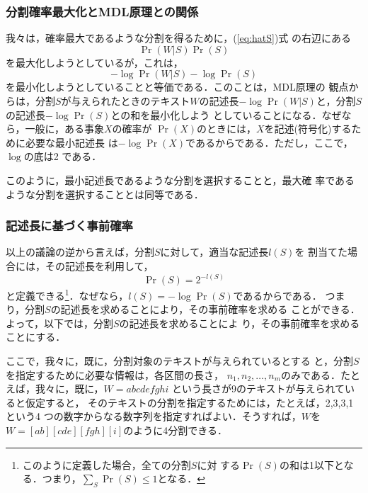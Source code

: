 \subsubsection{分割確率最大化とMDL原理との関係}

我々は，確率最大であるような分割を得るために，(\ref{eq:hatS})式
の右辺にある
\begin{equation}
  \Pr(W|S) \Pr(S)
\end{equation}
を最大化しようとしているが，これは，
\begin{equation}
  - \log \Pr(W|S) - \log \Pr(S)
\end{equation}
を最小化しようとしていることと等価である．このことは，MDL原理の
観点からは，分割$S$が与えられたときのテキスト$W$の記述長$-\log
\Pr(W|S)$と，分割$S$の記述長$-\log \Pr(S)$との和を最小化しよう
としていることになる．なぜなら，一般に，ある事象$X$の確率が
$\Pr(X)$のときには，$X$を記述(符号化)するために必要な最小記述長
は$-\log \Pr(X)$であるからである．ただし，ここで，$\log$の底は2
である．

このように，最小記述長であるような分割を選択することと，最大確
率であるような分割を選択することとは同等である．

\vspace{5pt}

\subsubsection{記述長に基づく事前確率}

以上の議論の逆から言えば，分割$S$に対して，適当な記述長$l(S)$を
割当てた場合には，その記述長を利用して，
\begin{equation}
  \label{eq:dl}
  \Pr(S) = 2^{-l(S)}
\end{equation}
と定義できる\footnote{このように定義した場合，全ての分割$S$に対
  する$\Pr(S)$の和は1以下となる．つまり，$\sum_{S} \Pr(S) \le
  1$となる\cite{yamanishi92}．}．なぜなら，$l(S) = - \log
\Pr(S)$であるからである．
つまり，分割$S$の記述長を求めることにより，その事前確率を求める
ことができる．よって，以下では，分割$S$の記述長を求めることによ
り，その事前確率を求めることにする．

ここで，我々に，既に，分割対象のテキストが与えられているとする
と，分割$S$を指定するために必要な情報は，各区間の長さ，
$n_1,n_2,\ldots,n_m$のみである．たとえば，我々に，既に，$W =
abcdefghi$ という長さが9のテキストが与えられていると仮定すると，
そのテキストの分割を指定するためには，たとえば，2,3,3,1 という4
つの数字からなる数字列を指定すればよい．そうすれば，$W$を$W =
[ab][cde][fgh][i]$のように4分割できる．

